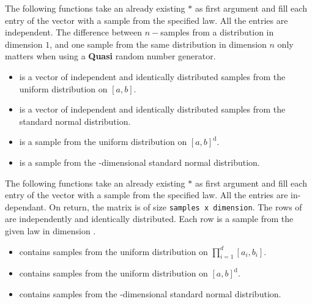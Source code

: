 The following functions take an already existing $\ast$ as
first argument and fill each entry of the vector with a sample from the
specified law. All the entries are independent. The difference between
$n-$samples from a distribution in dimension $1$, and one sample from the same
distribution in dimension $n$ only matters when using a {\bf Quasi} random
number generator.
\begin{itemize}
\item {}
  \sshortdescribe {} is a vector of independent and identically distributed
  samples from the uniform distribution on $[a, b]$.

\item {}
  \sshortdescribe {} is a vector of independent and identically distributed
  samples from the standard normal distribution.

\item {}
  \sshortdescribe {} is a sample from the uniform distribution on $[a, 
  b]^{\text{d}}$.

\item {}
  \sshortdescribe {} is a sample from the -dimensional
  standard normal distribution.

\end{itemize}

The following functions take an already existing $\ast$ as
first argument and fill each entry of the vector with a sample from the
specified law. All the entries are in-dependant. On return, the matrix 
is of size \verb!samples x dimension!. The rows of  are independently
and identically distributed. Each row is a sample from the given law in
dimension .
\begin{itemize}
\item {}
  \sshortdescribe {} contains  samples from the uniform
  distribution on $\prod_{i=1}^d [a_i, b_i]$.

\item {}
  \sshortdescribe {} contains  samples from the uniform
  distribution on $[a, b]^{\text{d}}$.
  
\item {}
  \sshortdescribe {} contains  samples from the
  -dimensional standard normal distribution.
\end{itemize}

